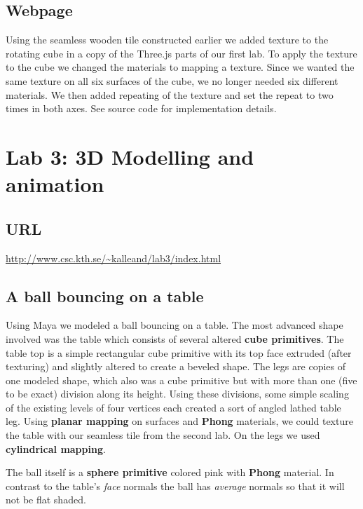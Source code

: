 \documentclass[a4paper]{article}
\begin{document}
\subsection{Webpage} %

Using the seamless wooden tile constructed earlier we added texture to the
rotating cube in a copy of the Three.js parts of our first lab. To apply the
texture to the cube we changed the materials to mapping a texture. Since we
wanted the same texture on all six surfaces of the cube, we no longer needed six
different materials. We then added repeating of the texture and set the repeat
to two times in both axes. See source code for implementation details.

\section{Lab 3: 3D Modelling and animation}

\subsection*{URL}

\url{http://www.csc.kth.se/~kalleand/lab3/index.html}

\subsection{A ball bouncing on a table} %

Using Maya we modeled a ball bouncing on a table. The most advanced shape
involved was the table  which consists of several altered \textbf{cube
primitives}. The table top is a simple rectangular cube primitive with its top
face extruded (after texturing) and slightly altered to create a beveled shape.
The legs are copies of one modeled shape, which also was a cube primitive but
with more than one (five to be exact) division along its height. Using these
divisions, some simple scaling of the existing levels of four vertices each
created a sort of angled lathed table leg. Using \textbf{planar mapping} on
surfaces and \textbf{Phong} materials, we could texture the table with our
seamless tile from the second lab. On the legs we used \textbf{cylindrical
mapping}.

The ball itself is a \textbf{sphere primitive} colored pink with \textbf{Phong}
material. In contrast to the table's \textit{face} normals the ball has
\textit{average} normals so that it will not be flat shaded.
\end{document}
